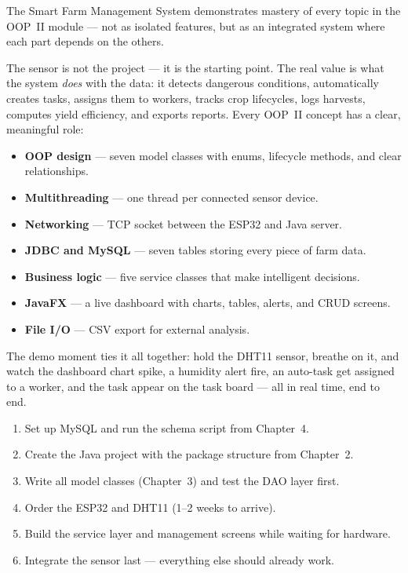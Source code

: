 \documentclass[12pt, a4paper]{report}
\begin{document}
The Smart Farm Management System demonstrates mastery of every topic in the OOP~II module --- not as isolated features, but as an integrated system where each part depends on the others.

The sensor is not the project --- it is the starting point. The real value is what the system \emph{does} with the data: it detects dangerous conditions, automatically creates tasks, assigns them to workers, tracks crop lifecycles, logs harvests, computes yield efficiency, and exports reports. Every OOP~II concept has a clear, meaningful role:

\begin{itemize}
    \item \textbf{OOP design} --- seven model classes with enums, lifecycle methods, and clear relationships.
    \item \textbf{Multithreading} --- one thread per connected sensor device.
    \item \textbf{Networking} --- TCP socket between the ESP32 and Java server.
    \item \textbf{JDBC and MySQL} --- seven tables storing every piece of farm data.
    \item \textbf{Business logic} --- five service classes that make intelligent decisions.
    \item \textbf{JavaFX} --- a live dashboard with charts, tables, alerts, and CRUD screens.
    \item \textbf{File I/O} --- CSV export for external analysis.
\end{itemize}

The demo moment ties it all together: hold the DHT11 sensor, breathe on it, and watch the dashboard chart spike, a humidity alert fire, an auto-task get assigned to a worker, and the task appear on the task board --- all in real time, end to end.

\vspace{20pt}
\begin{tcolorbox}[notebox, title={Getting Started}]
\begin{enumerate}[noitemsep]
    \item Set up MySQL and run the schema script from Chapter~4.
    \item Create the Java project with the package structure from Chapter~2.
    \item Write all model classes (Chapter~3) and test the DAO layer first.
    \item Order the ESP32 and DHT11 (1--2 weeks to arrive).
    \item Build the service layer and management screens while waiting for hardware.
    \item Integrate the sensor last --- everything else should already work.
\end{enumerate}
\end{tcolorbox}
\end{document}
